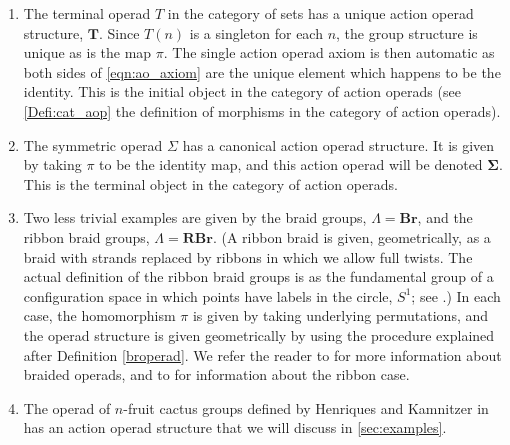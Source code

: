 \documentclass{amsbook} %
\newcommand{\mb}{\mathbf}
\numberwithin{section}{chapter}
\begin{document}
\begin{example}
\begin{enumerate}
\item The terminal operad $T$ in the category of sets has a unique action operad structure, $\mathbf{T}$.  Since $T(n)$ is a singleton for each $n$, the group structure is unique as is the map $\pi$.  The single action operad axiom is then automatic as both sides of \cref{eqn:ao_axiom} are the unique element which happens to be the identity.  This is the initial object in the category of action operads (see \cref{Defi:cat_aop} the definition of morphisms in the category of action operads).
\item The symmetric operad $\Sigma$ has a canonical action operad structure.  It is given by taking $\pi$ to be the identity map, and this action operad will be denoted $\mathbf{\Sigma}$.  This is the terminal object in the category of action operads.
\item Two less trivial examples are given by the braid groups, $\Lambda = \mb{Br}$, and the ribbon braid groups, $\Lambda = \mb{RBr}$.  (A ribbon braid is given, geometrically, as a braid with strands replaced by ribbons in which we allow full twists.  The actual definition of the ribbon braid groups is as the fundamental group of a configuration space in which points have labels in the circle, $S^{1}$; see \cite{sal-wahl}.)  In each case, the homomorphism $\pi$ is given by taking underlying permutations, and the operad structure is given geometrically by using the procedure explained after Definition \ref{broperad}.  We refer the reader to \cite{fie-br} for more information about braided operads, and to \cite{sal-wahl, wahl-thesis} for information about the ribbon case.
\item The operad of $n$-fruit cactus groups defined by Henriques and Kamnitzer in \cite{hk-cobound} has an action operad structure that we will discuss in \cref{sec:examples}.
\end{enumerate}
\end{example}
\end{document}
